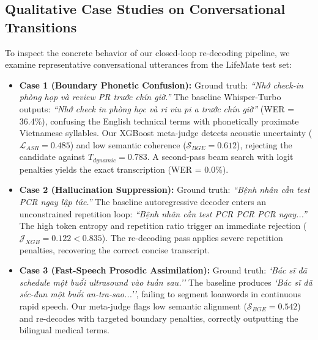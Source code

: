 \documentclass[9pt, conference, a4paper, compsocconf]{IEEEtran}
\begin{document}
\subsection{Qualitative Case Studies on Conversational Transitions}
To inspect the concrete behavior of our closed-loop re-decoding pipeline, we examine representative conversational utterances from the LifeMate test set:
\begin{itemize}
    \item \textbf{Case 1 (Boundary Phonetic Confusion):} Ground truth: \textit{``Nhớ check-in phòng họp và review PR trước chín giờ.''} The baseline Whisper-Turbo outputs: \textit{``Nhớ check in phòng học và ri viu pi a trước chín giờ''} (WER = 36.4\%), confusing the English technical terms with phonetically proximate Vietnamese syllables. Our XGBoost meta-judge detects acoustic uncertainty ($\mathcal{L}_{ASR} = 0.485$) and low semantic coherence ($\mathcal{S}_{BGE} = 0.612$), rejecting the candidate against $T_{dynamic} = 0.783$. A second-pass beam search with logit penalties yields the exact transcription (WER = 0.0\%).
    \item \textbf{Case 2 (Hallucination Suppression):} Ground truth: \textit{``Bệnh nhân cần test PCR ngay lập tức.''} The baseline autoregressive decoder enters an unconstrained repetition loop: \textit{``Bệnh nhân cần test PCR PCR PCR ngay...''} The high token entropy and repetition ratio trigger an immediate rejection ($\mathcal{J}_{XGB} = 0.122 < 0.835$). The re-decoding pass applies severe repetition penalties, recovering the correct concise transcript.
    \item \textbf{Case 3 (Fast-Speech Prosodic Assimilation):} Ground truth: \textit{`Bác sĩ đã schedule một buổi ultrasound vào tuần sau.''} The baseline produces \textit{`Bác sĩ đã séc-đun một buổi an-tra-sao...''}, failing to segment loanwords in continuous rapid speech. Our meta-judge flags low semantic alignment ($\mathcal{S}_{BGE} = 0.542$) and re-decodes with targeted boundary penalties, correctly outputting the bilingual medical terms.
\end{itemize}
\end{document}

